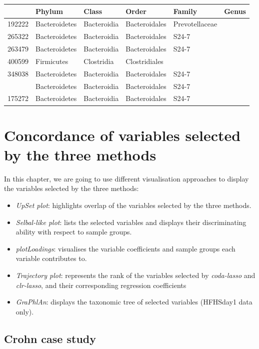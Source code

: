 \documentclass[openany]{book}
\providecommand{\tightlist}{%
  \setlength{\itemsep}{0pt}\setlength{\parskip}{0pt}}
\begin{document}
\begin{tabular}{llllll}
\toprule
  & Phylum & Class & Order & Family & Genus\\
\midrule
192222 & Bacteroidetes & Bacteroidia & Bacteroidales & Prevotellaceae & \\
265322 & Bacteroidetes & Bacteroidia & Bacteroidales & S24-7 & \\
263479 & Bacteroidetes & Bacteroidia & Bacteroidales & S24-7 & \\
400599 & Firmicutes & Clostridia & Clostridiales &  & \\
348038 & Bacteroidetes & Bacteroidia & Bacteroidales & S24-7 & \\
\addlinespace
198339 & Bacteroidetes & Bacteroidia & Bacteroidales & S24-7 & \\
175272 & Bacteroidetes & Bacteroidia & Bacteroidales & S24-7 & \\
\bottomrule
\end{tabular}

\chapter{Concordance of variables selected by the three
methods}\label{comparison}

In this chapter, we are going to use different visualisation approaches
to display the variables selected by the three methods:

\begin{itemize}
\tightlist
\item
  \emph{UpSet plot}: highlights overlap of the variables selected by the
  three methods.
\item
  \emph{Selbal-like plot}: lists the selected variables and displays
  their discriminating ability with respect to sample groups.
\item
  \emph{plotLoadings}: visualises the variable coefficients and sample
  groups each variable contributes to.
\item
  \emph{Trajectory plot}: represents the rank of the variables selected
  by \emph{coda-lasso} and \emph{clr-lasso}, and their corresponding
  regression coefficients
\item
  \emph{GraPhlAn}: displays the taxonomic tree of selected variables
  (HFHSday1 data only).
\end{itemize}

\section{Crohn case study}\label{crohn-case-study-3}
\end{document}
